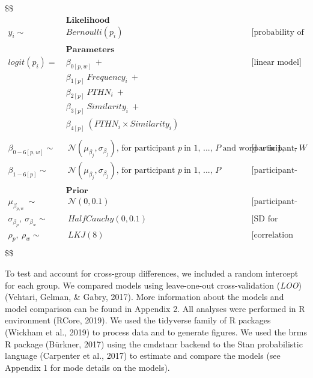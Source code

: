 \documentclass[
  english,
  man,floatsintext]{apa6}
\begin{document}
\$\$
\begin{align}

&\textbf{Likelihood}  \\
y_{i} \sim& Bernoulli(p_{i}) && \text{[probability of correct translation]} \\ \\

&\textbf{Parameters}  \\

logit(p_{i}) = ~ &  \beta_{0[p,w]} ~ +  && \text{[linear model]}\\
& \beta_{1[p]} ~ Frequency_{i} ~ + \\
& \beta_{2[p]} ~ PTHN_i ~ + \\
& \beta_{3[p]} ~ Similarity_i ~ + \\
& \beta_{4[p]} ~ (PTHN_i \times Similarity_i) \\ \\

\beta_{0-6[p,w]} \sim& ~  \mathcal{N}(\mu_{\beta_{j}}, \sigma_{\beta_{j}}) \text{, for participant } p ~\text{in 1, ..., } P ~\text{and  word } w ~\text{in 1, ..., } W && \text{[participant- and word-level intercepts]} \\
\beta_{1-6[p]} \sim& ~  \mathcal{N}(\mu_{\beta_{j}}, \sigma_{\beta_{j}}) \text{, for participant } p ~\text{in 1, ..., } P
&& \text{[participant-level coefficients]} \\ \\

&\textbf{Prior}  \\

\mu_{\beta_{p,w}} ~ \sim& ~ \mathcal{N}(0, 0.1) && \text{[participant-level coefficients]} \\
\sigma_{\beta_{p}}, ~ \sigma_{\beta_{w}} \sim& ~ HalfCauchy(0, 0.1) && \text{[SD for population and participant]} \\
\rho_{p}, ~ \rho_{w} \sim& ~LKJ(8) && \text{[correlation between participant-level coefficients]} \\


\end{align}
\$\$

To test and account for cross-group differences, we included a random intercept for each group. We compared models using leave-one-out cross-validation (\emph{LOO}) (Vehtari, Gelman, \& Gabry, 2017). More information about the models and model comparison can be found in Appendix 2. All analyses were performed in R environment (RCore, 2019). We used the tidyverse family of R packages (Wickham et al., 2019) to process data and to generate figures. We used the brms R package (Bürkner, 2017) using the cmdstanr backend to the Stan probabilistic language (Carpenter et al., 2017) to estimate and compare the models (see Appendix 1 for mode details on the models).
\end{document}
